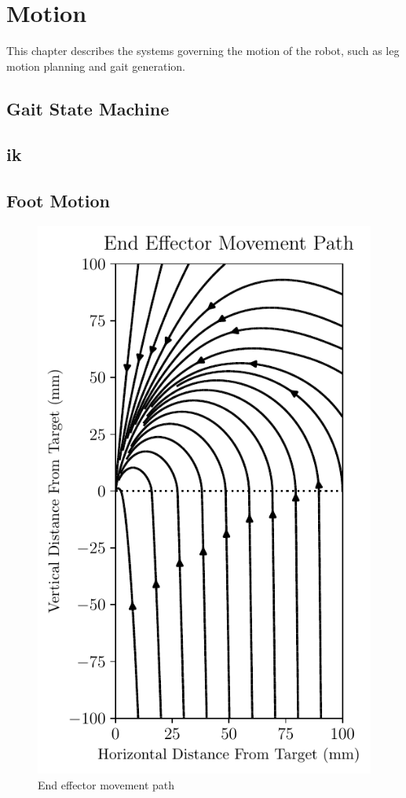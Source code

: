 \chapter{Motion}
This chapter describes the systems governing the motion of the robot, such as leg motion planning and gait generation.
\section{Gait State Machine}
\section{\acf{ik}}

\newpage
\section{Foot Motion}

\begin{figure}[h]
    \centering
    \hspace{-1.38cm}
    \includegraphics{figs/foot_path.pdf}
    \caption{End effector movement path}
\end{figure}






